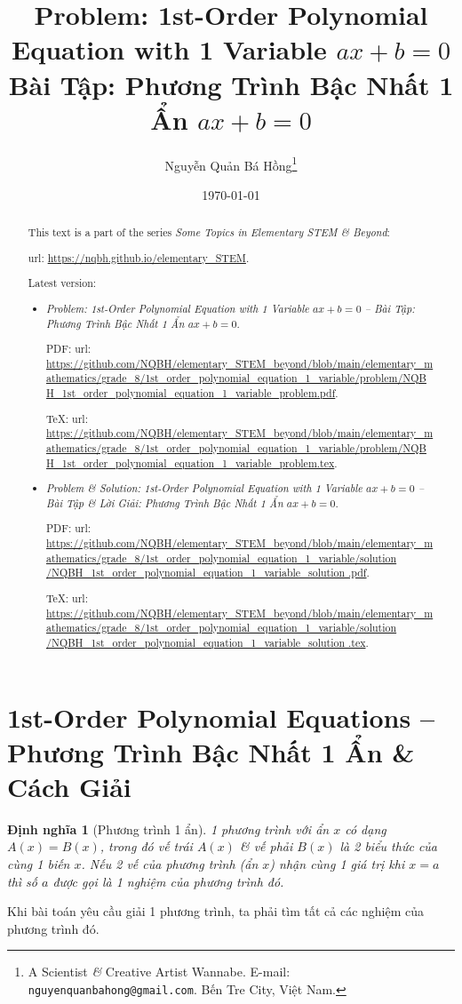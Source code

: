 \documentclass{article}
\title{Problem: 1st-Order Polynomial Equation with 1 Variable $ax + b = 0$\\Bài Tập: Phương Trình Bậc Nhất 1 Ẩn $ax + b = 0$}
\author{Nguyễn Quản Bá Hồng\footnote{A Scientist {\it\&} Creative Artist Wannabe. E-mail: {\tt nguyenquanbahong@gmail.com}. Bến Tre City, Việt Nam.}}
\date{\today}
\newtheorem{dinhnghia}{Định nghĩa}
\begin{document}
\maketitle
\begin{abstract}
	This text is a part of the series {\it Some Topics in Elementary STEM \& Beyond}:
	
	{\sc url}: \url{https://nqbh.github.io/elementary_STEM}.
	
	Latest version:
	\begin{itemize}
		\item {\it Problem: 1st-Order Polynomial Equation with 1 Variable $ax + b = 0$ -- Bài Tập: Phương Trình Bậc Nhất 1 Ẩn $ax + b = 0$}.
		
		PDF: {\sc url}: \url{https://github.com/NQBH/elementary_STEM_beyond/blob/main/elementary_mathematics/grade_8/1st_order_polynomial_equation_1_variable/problem/NQBH_1st_order_polynomial_equation_1_variable_problem.pdf}.
		
		\TeX: {\sc url}: \url{https://github.com/NQBH/elementary_STEM_beyond/blob/main/elementary_mathematics/grade_8/1st_order_polynomial_equation_1_variable/problem/NQBH_1st_order_polynomial_equation_1_variable_problem.tex}.
		\item {\it Problem \& Solution: 1st-Order Polynomial Equation with 1 Variable $ax + b = 0$ -- Bài Tập \& Lời Giải: Phương Trình Bậc Nhất 1 Ẩn $ax + b = 0$}.
		
		PDF: {\sc url}: \url{https://github.com/NQBH/elementary_STEM_beyond/blob/main/elementary_mathematics/grade_8/1st_order_polynomial_equation_1_variable/solution /NQBH_1st_order_polynomial_equation_1_variable_solution .pdf}.
		
		\TeX: {\sc url}: \url{https://github.com/NQBH/elementary_STEM_beyond/blob/main/elementary_mathematics/grade_8/1st_order_polynomial_equation_1_variable/solution /NQBH_1st_order_polynomial_equation_1_variable_solution .tex}.
	\end{itemize}
\end{abstract}
\tableofcontents
\newpage


\section{1st-Order Polynomial Equations -- Phương Trình Bậc Nhất 1 Ẩn \& Cách Giải}

\begin{dinhnghia}[Phương trình 1 ẩn]
	1 phương trình với ẩn $x$ có dạng $A(x) = B(x)$, trong đó \emph{vế trái} $A(x)$ \& \emph{vế phải} $B(x)$ là 2 biểu thức của cùng 1 biến $x$. Nếu 2 vế của phương trình (ẩn $x$) nhận cùng 1 giá trị khi $x = a$ thì số $a$ được gọi là 1 \emph{nghiệm} của phương trình đó.
\end{dinhnghia}
Khi bài toán yêu cầu giải 1 phương trình, ta phải tìm tất cả các nghiệm của phương trình đó.
\end{document}
